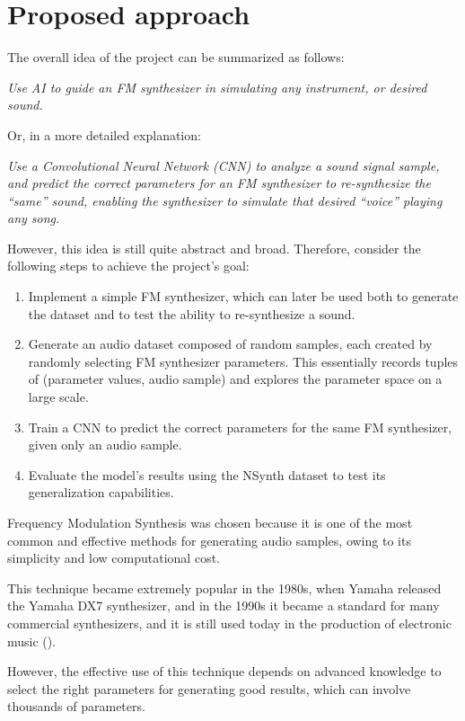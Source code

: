 \documentclass[sigconf,natbib=false]{acmart}
\begin{document}
\section{Proposed approach}

The overall idea of the project can be summarized as follows:

\textit{Use AI to guide an FM synthesizer in simulating any instrument, or desired sound.}

Or, in a more detailed explanation:

\textit{Use a Convolutional Neural Network (CNN) to analyze a sound signal sample, and predict the correct parameters for an FM synthesizer to re-synthesize the ``same'' sound, enabling the synthesizer to simulate that desired ``voice'' playing any song.}

However, this idea is still quite abstract and broad. Therefore, consider the following steps to achieve the project's goal:

\begin{enumerate}
\item Implement a simple FM synthesizer, which can later be used both to generate the dataset and to test the ability to re-synthesize a sound.
\item Generate an audio dataset composed of random samples, each created by randomly selecting FM synthesizer parameters. This essentially records tuples of (parameter values, audio sample) and explores the parameter space on a large scale.
\item Train a CNN to predict the correct parameters for the same FM synthesizer, given only an audio sample.
\item Evaluate the model's results using the NSynth dataset to test its generalization capabilities.
\end{enumerate}

Frequency Modulation Synthesis was chosen because it is one of the most common and effective methods for generating audio samples, owing to its simplicity and low computational cost.

This technique became extremely popular in the 1980s, when Yamaha released the Yamaha DX7 synthesizer, and in the 1990s it became a standard for many commercial synthesizers, and it is still used today in the production of electronic music (\textcite{claesson2021resynthesis}).

However, the effective use of this technique depends on advanced knowledge to select the right parameters for generating good results, which can involve thousands of parameters.
\end{document}
